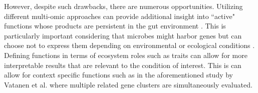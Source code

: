 However, despite such drawbacks, there are numerous opportunities. Utilizing different multi-omic approaches can provide additional insight into ``active" functions whose products are persistent in the gut environment \cite{jiang2016metatranscriptomic}. This is particularly important considering that microbes might harbor genes but can choose not to express them depending on environmental or ecological conditions \cite{metagenomicsofthehumanintestinaltractmetahitconsortium2016transcriptional}. Defining functions in terms of ecosystem roles such as traits \cite{weissman2021exploring} can allow for more interpretable results that are relevant to the condition of interest. This is can allow for context specific functions such as in the aforementioned study by Vatanen et al. \cite{vatanen2018human} where multiple related gene clusters are simultaneously evaluated.   